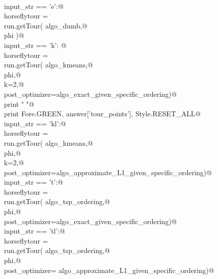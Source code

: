 \documentclass[11.5pt]{report}
\begin{document}
\begin{flushleft}
\begin{list}{}{}
\mbox{}\verb@@\\
\mbox{}\verb@if   input_str == 'e':@\\
\mbox{}\verb@      horseflytour = \@\\
\mbox{}\verb@             run.getTour( algo_dumb,@\\
\mbox{}\verb@                          phi )@\\
\mbox{}\verb@elif input_str == 'k': @\\
\mbox{}\verb@      horseflytour = \@\\
\mbox{}\verb@             run.getTour( algo_kmeans,@\\
\mbox{}\verb@                          phi,@\\
\mbox{}\verb@                          k=2,@\\
\mbox{}\verb@                          post_optimizer=algo_exact_given_specific_ordering)@\\
\mbox{}\verb@      print " "@\\
\mbox{}\verb@      print Fore.GREEN, answer['tour_points'], Style.RESET_ALL@\\
\mbox{}\verb@elif input_str == 'kl':@\\
\mbox{}\verb@      horseflytour = \@\\
\mbox{}\verb@             run.getTour( algo_kmeans,@\\
\mbox{}\verb@                          phi,@\\
\mbox{}\verb@                          k=2,@\\
\mbox{}\verb@                          post_optimizer=algo_approximate_L1_given_specific_ordering)@\\
\mbox{}\verb@elif input_str == 't':@\\
\mbox{}\verb@      horseflytour = \@\\
\mbox{}\verb@             run.getTour( algo_tsp_ordering,@\\
\mbox{}\verb@                          phi,@\\
\mbox{}\verb@                          post_optimizer=algo_exact_given_specific_ordering)@\\
\mbox{}\verb@elif input_str == 'tl':@\\
\mbox{}\verb@      horseflytour = \@\\
\mbox{}\verb@             run.getTour( algo_tsp_ordering,@\\
\mbox{}\verb@                          phi,@\\
\mbox{}\verb@                          post_optimizer= algo_approximate_L1_given_specific_ordering)@\\

\end{list}
\end{flushleft}
\end{document}
